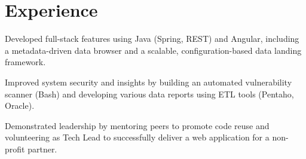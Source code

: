 \documentclass[]{main}
\begin{document}
\hfill
\begin{minipage}[t]{0.73\textwidth} 


\section{Experience}

\vspace{\topsep} %
\begin{tightemize}
\item Developed full-stack features using Java (Spring, REST) and Angular, including a metadata-driven data browser and a scalable, configuration-based data landing framework.
\item Improved system security and insights by building an automated vulnerability scanner (Bash) and developing various data reports using ETL tools (Pentaho, Oracle).
\item Demonstrated leadership by mentoring peers to promote code reuse and volunteering as Tech Lead to successfully deliver a web application for a non-profit partner.
\end{tightemize}
\sectionsep


\end{minipage}
\end{document}
